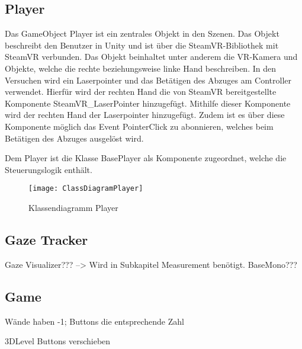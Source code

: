 \subsection{Player}
Das GameObject \glqq Player\grqq{} ist ein zentrales Objekt in den Szenen. Das Objekt beschreibt den Benutzer in Unity und ist über die SteamVR-Bibliothek mit SteamVR verbunden. Das Objekt beinhaltet unter anderem die VR-Kamera und Objekte, welche die rechte beziehungsweise linke Hand beschreiben. In den Versuchen wird ein Laserpointer und das Betätigen des Abzuges am Controller verwendet. Hierfür wird der rechten Hand die von SteamVR bereitgestellte Komponente \glqq SteamVR\_LaserPointer\grqq{} hinzugefügt. Mithilfe dieser Komponente wird der rechten Hand der Laserpointer hinzugefügt. Zudem ist es über diese Komponente möglich das Event PointerClick zu abonnieren, welches beim Betätigen des Abzuges ausgelöst wird. 

Dem Player ist die Klasse \glqq BasePlayer\grqq{} als Komponente zugeordnet, welche die Steuerungslogik enthält. 

\begin{figure}[!htbp]
	\centering
	\texttt{[image: ClassDiagramPlayer]}
	\caption[Klassendiagramm Player]{Klassendiagramm Player}
	\label{fig:ClassDiagramPlayer}
\end{figure}

\subsection{Gaze Tracker}
Gaze Visualizer??? --> Wird in Subkapitel Measurement benötigt.
BaseMono???

\subsection{Game}

Wände haben -1; Buttons die entsprechende Zahl

3DLevel Buttons verschieben

